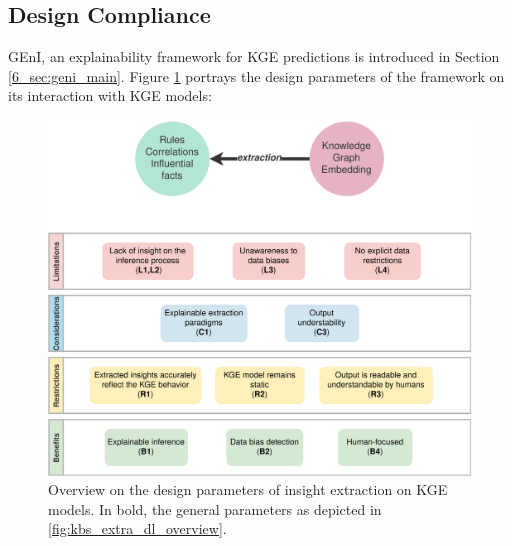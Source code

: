 \subsection{Design Compliance}\label{6_sec:subsec:geni_design_compliance}
GEnI, an explainability framework for KGE predictions is introduced in Section \ref{6_sec:geni_main}. Figure \ref{fig:design_compliance_geni} portrays the design parameters of the framework on its interaction with KGE models: 
\begin{figure}[t]
    \centering
    \includegraphics[width=\linewidth]{6_kbsextractiondl/figures/Instance_GENI_extraction_DL.eps}
    \caption{Overview on the design parameters of insight extraction on KGE models. In bold, the general parameters as depicted in \ref{fig:kbs_extra_dl_overview}.}
    \label{fig:design_compliance_geni}
\end{figure}

